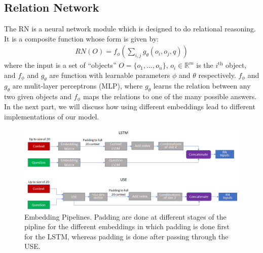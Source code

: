 \documentclass{article}
\begin{document}
\subsection{Relation Network}


%

The RN is a neural network module which is designed to do relational reasoning. It is a composite function whose form is given by:
\begin{align}
RN(O) = f_\phi\left(\sum_{i,j}g_\theta(o_i,o_j,q)\right)\label{eq:RNform}
\end{align}
where the input is a set of ``objects'' $O=\{o_1,\ldots,o_n\}$, $o_i \in \mathbb{R}^m$ is the $i^{\text{th}}$ object, and $f_\phi$ and $g_\theta$ are function with learnable parameters $\phi$ and $\theta$ respectively. $f_\phi$ and $g_\theta$ are mulit-layer perceptrons (MLP), where $g_\theta$ learns the relation between any two given objects and $f_\phi$ maps the relations to one of the many possible answers. In the next part, we will discuss how using different embeddings lead to different implementations of our model.


\begin{figure}[h]
  \centering
  \includegraphics[scale=0.70]{lstmuse.png}
  \caption{Embedding Pipelines. Padding are done at different stages of the pipline for the different embeddings in which padding is done first for the LSTM, whereas padding is done after passing through the USE. }
\end{figure}
\end{document}
